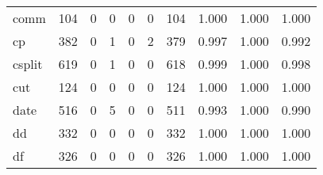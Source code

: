\begin{longtable}{lp{2.0cm}p{2.0cm}p{2.0cm}p{2.0cm}p{2.0cm}p{2.0cm}p{2.0cm}p{2.0cm}p{2.0cm}}
comm      &                    104 &                                             0 &                                            0 &                                           0 &                                            0 &                                        104 &                                1.000 &                                  1.000 &                                1.000 \\
cp        &                    382 &                                             0 &                                            1 &                                           0 &                                            2 &                                        379 &                                0.997 &                                  1.000 &                                0.992 \\
csplit    &                    619 &                                             0 &                                            1 &                                           0 &                                            0 &                                        618 &                                0.999 &                                  1.000 &                                0.998 \\
cut       &                    124 &                                             0 &                                            0 &                                           0 &                                            0 &                                        124 &                                1.000 &                                  1.000 &                                1.000 \\
date      &                    516 &                                             0 &                                            5 &                                           0 &                                            0 &                                        511 &                                0.993 &                                  1.000 &                                0.990 \\
dd        &                    332 &                                             0 &                                            0 &                                           0 &                                            0 &                                        332 &                                1.000 &                                  1.000 &                                1.000 \\
df        &                    326 &                                             0 &                                            0 &                                           0 &                                            0 &                                        326 &                                1.000 &                                  1.000 &                                1.000 \\

\end{longtable}
